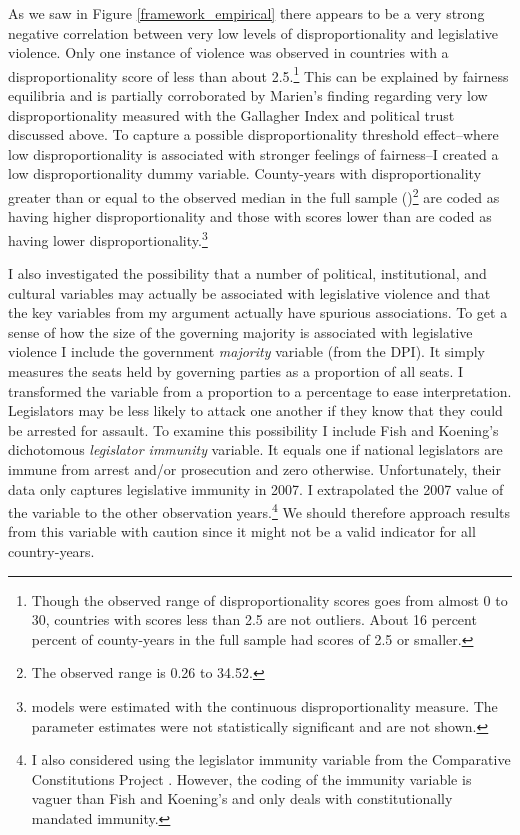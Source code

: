 \documentclass[a4paper]{article}\usepackage[]{graphicx}\usepackage[]{color}
\begin{document}
As we saw in Figure \ref{framework_empirical} there appears to be a very strong negative correlation between very low levels of disproportionality and legislative violence. Only one instance of violence was observed in countries with a disproportionality score of less than about 2.5.\footnote{Though the observed range of disproportionality scores goes from almost 0 to 30, countries with scores less than 2.5 are not outliers. About 16 percent percent of county-years in the full sample had scores of 2.5 or smaller.} This can be explained by fairness equilibria and is partially corroborated by Marien's \citeyearpar{Marien2011} finding regarding very low disproportionality measured with the Gallagher Index and political trust discussed above. To capture a possible disproportionality threshold effect--where low disproportionality is associated with stronger feelings of fairness--I created a low disproportionality dummy variable. County-years with disproportionality greater than or equal to the observed median in the full sample ()\footnote{The observed range is 0.26 to 34.52.} are coded as having higher disproportionality and those with scores lower than  are coded as having lower disproportionality.\footnote{ models were estimated with the continuous disproportionality measure. The parameter estimates were not statistically significant and are not shown.}

I also investigated the possibility that a number of political, institutional, and cultural variables may actually be associated with legislative violence and that the key variables from my argument actually have spurious associations. To get a sense of how the size of the governing majority is associated with legislative violence I include the government {\emph{majority}} variable (from the DPI). It simply measures the seats held by governing parties as a proportion of all seats. I transformed the variable from a proportion to a percentage to ease interpretation. Legislators may be less likely to attack one another if they know that they could be arrested for assault. To examine this possibility I include Fish and Koening's \citeyearpar{Fish2009} dichotomous \emph{legislator immunity} variable. It equals one if national legislators are immune from arrest and/or prosecution and zero otherwise. Unfortunately, their data only captures legislative immunity in 2007. I extrapolated the 2007 value of the variable to the other observation years.\footnote{I also considered using the legislator immunity variable from the Comparative Constitutions Project \citep{ElkinsCCP2010}. However, the coding of the immunity variable is vaguer than Fish and Koening's and only deals with constitutionally mandated immunity.} We should therefore approach results from this variable with caution since it might not be a valid indicator for all country-years.
\end{document}

